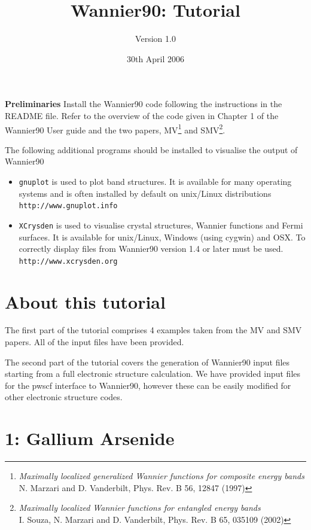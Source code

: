 \documentclass[a4paper,11pt,twoside]{article}
\title{Wannier90: Tutorial}
\author{Version 1.0}
\date{30th April 2006}
\begin{document}
\maketitle

{\bf Preliminaries}
Install the Wannier90 code following the instructions in the README file.
Refer to the overview of the code given in Chapter 1 of the Wannier90 User guide
and the two papers, MV\footnote{{\it Maximally localized generalized
    Wannier functions for composite energy bands}\\ N. Marzari and
  D. Vanderbilt, Phys. Rev. B 56, 12847 (1997)} 
 and SMV\footnote{{\it Maximally localized Wannier functions for entangled energy bands}\\
I. Souza, N. Marzari and D. Vanderbilt, Phys. Rev. B 65, 035109 (2002)}.


The following additional programs should be installed to visualise the output of Wannier90
\begin{itemize}
\item {\tt gnuplot} is used to plot band structures. It is 
available for many operating systems and is often installed by default on
 unix/Linux distributions\\
{\tt http://www.gnuplot.info}
\item {\tt XCrysden} is used to visualise crystal structures, Wannier functions and Fermi
surfaces. It is available for unix/Linux, Windows (using cygwin) and OSX. To correctly display
files from Wannier90 version 1.4 or later must be used.\\
{\tt http://www.xcrysden.org}
\end{itemize}



\section*{About this tutorial}

The first part of the tutorial comprises 4 examples taken from the MV and SMV papers.
All of the input files have been provided.

The second part of the tutorial covers the generation of Wannier90 input files
starting from a full electronic structure calculation. We have provided input files for the pwscf
interface to Wannier90, however these can be easily modified for other electronic structure
codes.

\cleardoublepage

\section*{1: Gallium Arsenide}
\end{document}

